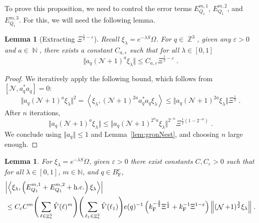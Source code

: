 \documentclass[12pt,a4paper]{article}
\numberwithin{equation}{section}
\newcommand{\cN}{\mathcal{N}}
\newcommand{\NNN}{\mathbb{N}}
\newcommand{\1}{\mathbb{I}}
\newcommand{\F}{\mathrm{F}}
\DeclareMathOperator{\N}{\mathbb{N}}
\DeclareMathOperator{\Z}{\mathbb{Z}}
\DeclareMathOperator{\NN}{\mathcal{N}}
\newcommand{\half}{\frac{1}{2}}
\newcommand{\eva}[1]{\left\langle #1 \right\rangle}
\theoremstyle{plain}
\newtheorem{lemma}[theorem]{Lemma}
\theoremstyle{definition}
\theoremstyle{remark}
\theoremstyle{plain}
\theoremstyle{definition}
\theoremstyle{remark}
\begin{document}
To prove this proposition, we need to control the error terms $ E^{m,1}_{Q_1} $, $ E^{m,2}_{Q_1} $, and $ E^{m,3}_{Q_1} $. For this, we will need the following lemma.

\begin{lemma} [Extracting $ \Xi^{\half-\varepsilon} $] \label{lem:Xi_halfminusepsilon}
Recall $ \xi_\lambda = e^{-\lambda S} \Omega $. For $ q \in \Z^3 $, given any $ \varepsilon > 0 $ and $ a \in \N $, there exists a constant $ C_{a,\varepsilon} $ such that for all $ \lambda \in [0,1] $
\begin{equation} \label{eq:Xi_halfminusepsilon}
	\Vert a_q (\cN + 1)^a \xi_\lambda \Vert
	\le C_{a,\varepsilon} \Xi^{\half-\varepsilon} \;.
\end{equation}
\end{lemma}

\begin{proof}
We iteratively apply the following bound, which follows from $ [\cN, a_q^* a_q] = 0 $:
\begin{equation}
	\Vert a_q (\cN + 1)^a \xi_\lambda \Vert^2
	= \eva{\xi_\lambda, (\cN + 1)^{2a} a_q^* a_q \xi_\lambda}
	\le \Vert a_q (\cN + 1)^{2a} \xi_\lambda \Vert \Xi^{\frac 12} \;.
\end{equation}
After $ n $ iterations,
\begin{equation}
	\Vert a_q (\cN + 1)^a \xi_\lambda \Vert
	\le \Vert a_q (\cN + 1)^{2^n a} \xi_\lambda \Vert^{2^{-n}} \Xi^{\half (1-2^{-n})} \;.
\end{equation}
We conclude using $ \Vert a_q \Vert \le 1 $ and Lemma~\ref{lem:gronNest}, and choosing $ n $ large enough.
\end{proof}



\begin{lemma} \label{lem:EQ111}
For $\xi_\lambda = e^{-\lambda S} \Omega$, given $ \varepsilon > 0 $ there exist constants $ C, C_\varepsilon > 0 $ such that for all $ \lambda \in [0,1] $, $ m \in \NNN $, and $ q \in B_{\F}^c $,
\begin{equation} \label{eq:estEQ111}
\begin{aligned}
	&\abs{\eva{\xi_\lambda,\left(E^{m,1}_{Q_1}+E^{m,2}_{Q_1}+\mathrm{h.c.}\right) \xi_\lambda }} \\
	&\leq C_\varepsilon C^m \Bigg(\sum_{\ell \in \Z^3_*} \hat{V}(\ell)^m\Bigg)
		\Bigg( \sum_{\ell_1 \in \Z^3_*} \hat{V}(\ell_1) \Bigg)
		e(q)^{-1} \left(
		k_{\F}^{-\frac{3}{2}} \Xi^\half
		+ k_{\F}^{-1}\Xi^{1-\varepsilon} \right)
		\norm{ (\NN+1)^{\frac 32} \xi_\lambda} \;.
\end{aligned}
\end{equation}
\end{lemma}
\end{document}
